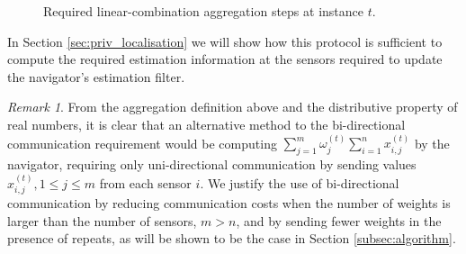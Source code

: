 \documentclass[10pt,journal,compsoc]{IEEEtran}
\theoremstyle{definition}
\theoremstyle{definition}
\theoremstyle{remark}
\newtheorem*{remark}{Remark}
\begin{document}
\begin{figure}[htbp]
\vspace{\baselineskip}
\caption{Required linear-combination aggregation steps at instance $t$.}
\label{fig:agg_steps}
\end{figure}

In Section \ref{sec:priv_localisation} we will show how this protocol is sufficient to compute the required estimation information at the sensors required to update the navigator's estimation filter.

\begin{remark}
    From the aggregation definition above and the distributive property of real numbers, it is clear that an alternative method to the bi-directional communication requirement would be computing $\sum^{m}_{j=1}\omega_j^{(t)}\sum^{n}_{i=1} x_{i,j}^{(t)}$ by the navigator, requiring only uni-directional communication by sending values $x_{i,j}^{(t)}, 1 \leq j \leq m$ from each sensor $i$. We justify the use of bi-directional communication by reducing communication costs when the number of weights is larger than the number of sensors, $m>n$, and by sending fewer weights in the presence of repeats, as will be shown to be the case in Section \ref{subsec:algorithm}.
\end{remark}

% 
% 
\end{document}

